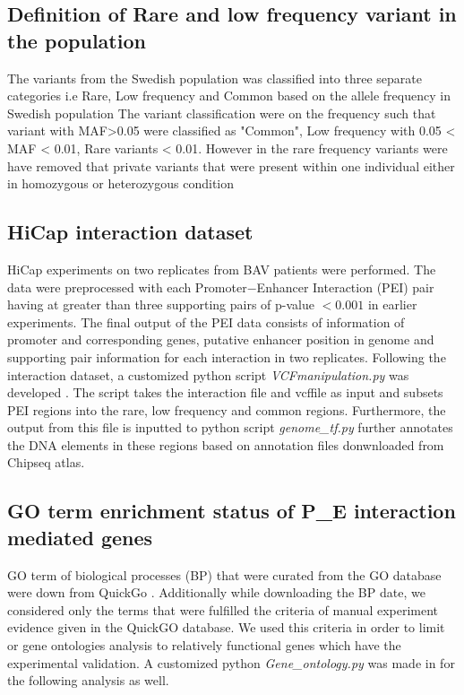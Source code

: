 \documentclass[10pt]{article} %
\begin{document}
\subsection{Definition of Rare and low frequency variant in the population}

The variants from the Swedish population was classified into three separate categories i.e Rare, Low frequency and Common based on the allele frequency  in Swedish  population The variant classification were on the frequency such that variant with MAF\textgreater{}0.05 were classified as "Common", Low frequency with 0.05 \textless{} MAF \textless{} 0.01, Rare variants \textless{} 0.01. However in the rare frequency variants were have removed that private variants that were present within one individual either in homozygous or heterozygous condition



\subsection{HiCap interaction dataset}

HiCap experiments on two replicates from BAV patients were performed. The data were preprocessed with each Promoter$-$Enhancer Interaction (PEI)  pair having at greater than three supporting pairs of p-value $< 0.001$  in earlier experiments. The final output of the PEI data consists of information of promoter and corresponding genes, putative  enhancer position in genome and supporting pair information for each interaction in  two replicates. 
Following the interaction dataset, a customized python script \textit{VCFmanipulation.py}  was developed . The script  takes the interaction file  and vcffile as input and subsets PEI regions into the rare, low frequency and common regions. Furthermore, the output from this file is inputted to  python script \textit{genome\_tf.py} further annotates the DNA elements in these regions based on annotation files donwnloaded from Chipseq atlas. 

\subsection {GO term enrichment status of P\_E interaction mediated genes}

GO term of biological processes (BP) that were curated from the GO database were down from QuickGo \cite{quickgo} . Additionally while downloading  the  BP date, we considered only the terms that were fulfilled the criteria of manual experiment evidence given in the QuickGO database. We used this criteria in order to limit or gene ontologies analysis to relatively functional genes which have the experimental validation. A customized python \textit{Gene\_ontology.py} was made in for the following analysis as well.
\end{document}

